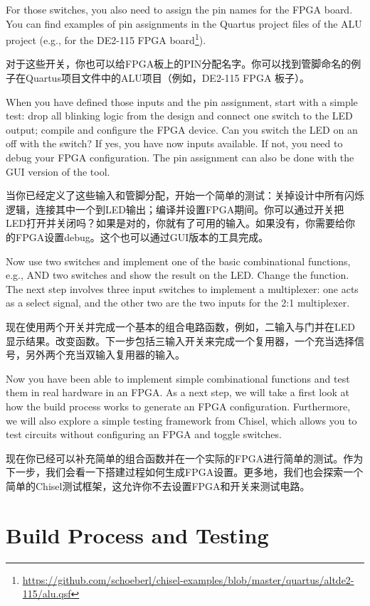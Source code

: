 \documentclass[%
    10pt,
    headinclude, footexclude,
    openright, %
    notitlepage,
    cleardoubleempty,
    headsepline,
    pointlessnumbers,
    bibtotoc, idxtotoc,
    ]{scrbook}
\newcommand{\myref}[2]{\href{#1}{#2}}
\renewcommand{\myref}[2]{{#2}{\footnote{\url{#1}}}}
\begin{document}

\noindent For those switches, you also need to assign the pin names for the FPGA board.
You can find examples of pin assignments in the Quartus project files of the ALU project
(e.g., for the \myref{https://github.com/schoeberl/chisel-examples/blob/master/quartus/altde2-115/alu.qsf}{DE2-115
FPGA board}).

对于这些开关，你也可以给FPGA板上的PIN分配名字。你可以找到管脚命名的例子在Quartus项目文件中的ALU项目（例如，DE2-115 FPGA 板子）。

When you have defined those inputs and the pin assignment, start with a simple test:
drop all blinking logic from the design and connect one switch to the LED output;
compile and configure the FPGA device. Can you switch the LED on an off with the switch?
If yes, you have now inputs available. If not, you need to debug your FPGA configuration.
The pin assignment can also be done with the GUI version of the tool.

当你已经定义了这些输入和管脚分配，开始一个简单的测试：关掉设计中所有闪烁逻辑，连接其中一个到LED输出；编译并设置FPGA期间。你可以通过开关把LED打开并关闭吗？如果是对的，你就有了可用的输入。如果没有，你需要给你的FPGA设置debug。这个也可以通过GUI版本的工具完成。


Now use two switches and implement one of the basic combinational functions,
e.g., AND two switches and show the result on the LED. Change the function.
The next step involves three input switches to implement a multiplexer: one acts as
a select signal, and the other two are the two inputs for the 2:1 multiplexer.

现在使用两个开关并完成一个基本的组合电路函数，例如，二输入与门并在LED显示结果。改变函数。下一步包括三输入开关来完成一个复用器，一个充当选择信号，另外两个充当双输入复用器的输入。


Now you have been able to implement simple combinational functions and test them
in real hardware in an FPGA. As a next step, we will take a first look at how the build
process works to generate an FPGA configuration. Furthermore, we will also
explore a simple testing framework from Chisel, which allows you to test circuits
without configuring an FPGA and toggle switches.

现在你已经可以补充简单的组合函数并在一个实际的FPGA进行简单的测试。作为下一步，我们会看一下搭建过程如何生成FPGA设置。更多地，我们也会探索一个简单的Chisel测试框架，这允许你不去设置FPGA和开关来测试电路。


\chapter{Build Process and Testing}
\end{document}
